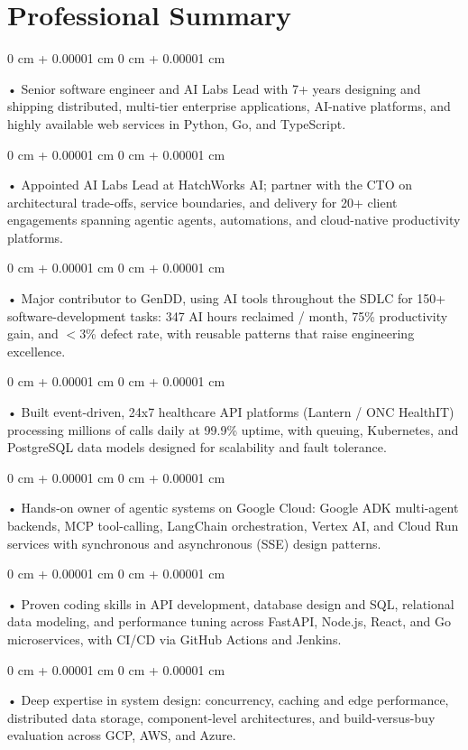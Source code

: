 \documentclass[10pt, letterpaper]{article}
\newenvironment{onecolentry}{
    \begin{adjustwidth}{
        0 cm + 0.00001 cm
    }{
        0 cm + 0.00001 cm
    }
}{
    \end{adjustwidth}
} %
\begin{document}
    \section{Professional Summary}
        \vspace{2 pt }
        \begin{onecolentry}
            • Senior software engineer and AI Labs Lead with 7+ years designing and shipping distributed, multi-tier enterprise applications, AI-native platforms, and highly available web services in Python, Go, and TypeScript.
        \end{onecolentry}
        \begin{onecolentry}
            • Appointed AI Labs Lead at HatchWorks AI; partner with the CTO on architectural trade-offs, service boundaries, and delivery for 20+ client engagements spanning agentic agents, automations, and cloud-native productivity platforms.
        \end{onecolentry}
        \begin{onecolentry}
            • Major contributor to GenDD, using AI tools throughout the SDLC for 150+ software-development tasks: 347 AI hours reclaimed / month, 75\% productivity gain, and $<$3\% defect rate, with reusable patterns that raise engineering excellence.
        \end{onecolentry}
        \begin{onecolentry}
            • Built event-driven, 24x7 healthcare API platforms (Lantern / ONC HealthIT) processing millions of calls daily at 99.9\% uptime, with queuing, Kubernetes, and PostgreSQL data models designed for scalability and fault tolerance.
        \end{onecolentry}
        \begin{onecolentry}
            • Hands-on owner of agentic systems on Google Cloud: Google ADK multi-agent backends, MCP tool-calling, LangChain orchestration, Vertex AI, and Cloud Run services with synchronous and asynchronous (SSE) design patterns.
        \end{onecolentry}
        \begin{onecolentry}
            • Proven coding skills in API development, database design and SQL, relational data modeling, and performance tuning across FastAPI, Node.js, React, and Go microservices, with CI/CD via GitHub Actions and Jenkins.
        \end{onecolentry}
        \begin{onecolentry}
            • Deep expertise in system design: concurrency, caching and edge performance, distributed data storage, component-level architectures, and build-versus-buy evaluation across GCP, AWS, and Azure.
        \end{onecolentry}
\end{document}
